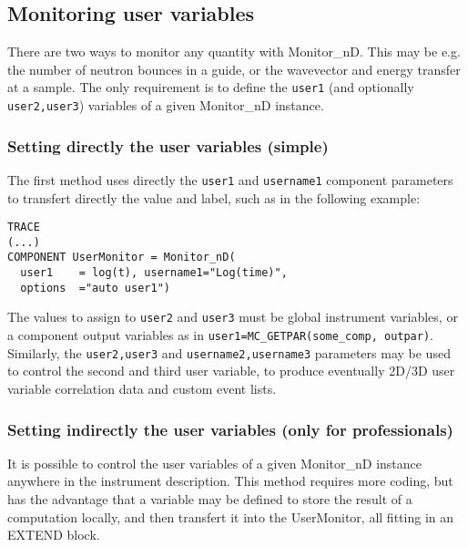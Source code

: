 \subsection{Monitoring user variables}
\label{s:monnd:user}

There are two ways to monitor any quantity with Monitor\_nD. This may be e.g. the number of neutron bounces in a guide, or the wavevector and energy transfer at a sample. The only requirement is to define the \verb+user1+ (and optionally \verb+user2,user3+) variables of a given Monitor\_nD instance.

\subsubsection{Setting directly the user variables (simple)}

The first method uses directly the \verb+user1+ and \verb+username1+ component parameters to transfert directly the value and label, such as in the following example:
\begin{lstlisting}
TRACE
(...)
COMPONENT UserMonitor = Monitor_nD(
  user1    = log(t), username1="Log(time)",
  options  ="auto user1")
\end{lstlisting}
The values to assign to \verb+user2+ and \verb+user3+ must be global instrument variables, or a component output variables as in \verb+user1=MC_GETPAR(some_comp, outpar)+.
Similarly, the \verb+user2,user3+ and \verb+username2,username3+ parameters may be used to control the second and third user variable, to produce eventually 2D/3D user variable correlation data and custom event lists.

\subsubsection{Setting indirectly the user variables (only for professionals)}

It is possible to control the user variables of a given Monitor\_nD instance anywhere in the instrument description. This method requires more coding, but has the advantage that a variable may be defined to store the result of a computation locally, and then transfert it into the UserMonitor, all fitting in an EXTEND block.


